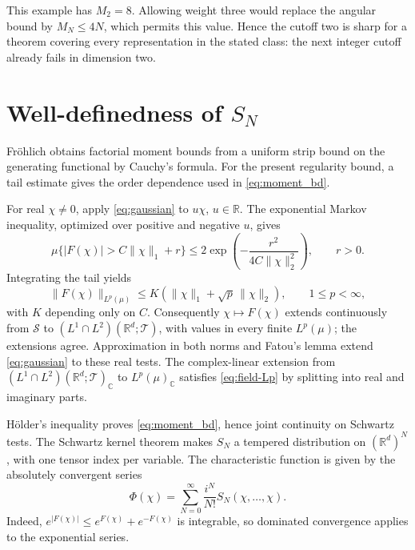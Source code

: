 \documentclass[11pt, letterpaper, reqno]{amsart}
\theoremstyle{definition}
\theoremstyle{remark}
\newcommand{\bbC}{\mathbb{C}}
\newcommand{\bbR}{\mathbb{R}}
\newcommand{\calS}{\mathcal{S}}
\newcommand{\calT}{\mathcal{T}}
\begin{document}
This example has $M_2=8$. Allowing weight three would replace the
angular bound by $M_N\leq4N$, which permits this value. Hence the
cutoff two is sharp for a theorem covering every representation in
the stated class: the next integer cutoff already fails in dimension
two.

\appendix

\section{Well-definedness of \texorpdfstring{$S_N$}{SN}}\label{sec:well-definedness}

Fr\"ohlich \cite[Lemma~3.2, pp.~276--277]{Frohlich} obtains factorial
moment bounds from a uniform strip bound on the generating functional
by Cauchy's formula. For the present regularity bound, a tail estimate
gives the order dependence used in \eqref{eq:moment_bd}.

For real $\chi\neq0$, apply \eqref{eq:gaussian} to $u\chi$, $u\in\bbR$.
The exponential Markov inequality, optimized over positive and
negative $u$, gives
\begin{equation}
 \mu\{|F(\chi)|>C\|\chi\|_1+r\}
 \leq2\exp\left(-\frac{r^2}{4C\|\chi\|_2^2}\right),\qquad r>0.
\end{equation}
Integrating the tail yields
\begin{equation}\label{eq:field-Lp}
 \|F(\chi)\|_{L^p(\mu)}\leq K(\|\chi\|_1+\sqrt p\,\|\chi\|_2),
 \qquad1\leq p<\infty,
\end{equation}
with $K$ depending only on $C$. Consequently $\chi\mapsto F(\chi)$
extends continuously from $\calS$ to
$(L^1\cap L^2)(\bbR^d;\calT)$, with values in every finite $L^p(\mu)$;
the extensions agree. Approximation in both norms and Fatou's lemma
extend \eqref{eq:gaussian} to these real tests. The complex-linear
extension from $(L^1\cap L^2)(\bbR^d;\calT)_\bbC$ to
$L^p(\mu)_\bbC$ satisfies
\eqref{eq:field-Lp} by splitting into real and imaginary parts.

H\"older's inequality proves \eqref{eq:moment_bd}, hence joint
continuity on Schwartz tests. The Schwartz kernel theorem makes
$S_N$ a tempered distribution on $(\bbR^d)^N$, with one tensor index
per variable. The characteristic function is given by the absolutely
convergent series
\begin{equation}
 \Phi(\chi)=\sum_{N=0}^\infty\frac{i^N}{N!}S_N(\chi,\dots,\chi).
\end{equation}
Indeed, $e^{|F(\chi)|}\leq e^{F(\chi)}+e^{-F(\chi)}$ is integrable,
so dominated convergence applies to the exponential series.
\end{document}
